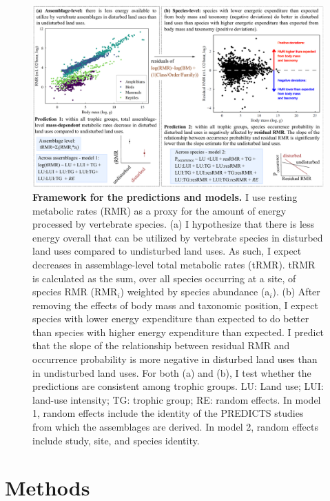 \begin{landscape}
\begin{figure}[h!]
\centering
\includegraphics[scale=0.75]{figures/Chapter5/Figure2}
\caption[Framework for the predictions and models]{\textbf{Framework for the predictions and models.} I use resting metabolic rates (RMR) as a proxy for the amount of energy processed by vertebrate species. (a) I hypothesize that there is less energy overall that can be utilized by vertebrate species in disturbed land uses compared to undisturbed land uses. As such, I expect decreases in assemblage-level total metabolic rates (tRMR). tRMR is calculated as the sum, over all species occurring at a site, of species RMR (RMR$_i$) weighted by species abundance (a$_i$). (b) After removing the effects of body mass and taxonomic position, I expect species with lower energy expenditure than expected to do better than species with higher energy expenditure than expected. I predict that the slope of the relationship between residual RMR and occurrence probability is more negative in disturbed land uses than in undisturbed land uses. For both (a) and (b), I test whether the predictions are consistent among trophic groups. LU: Land use; LUI: land-use intensity; TG: trophic group; RE: random effects. In model 1, random effects include the identity of the PREDICTS studies from which the assemblages are derived. In model 2, random effects include study, site, and species identity.}
\label{chap5_fig2}
\end{figure}
\end{landscape}


\clearpage

\section{Methods}

